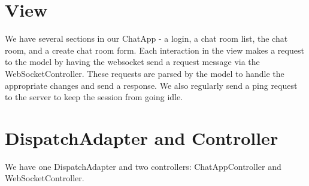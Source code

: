 \documentclass[letterpaper, 11pt]{article}
\begin{document}
\section{View}
We have several sections in our ChatApp - a login, a chat room list, the chat room, and a create chat room form. Each interaction in the view makes a request to the model by having the websocket send a request message via the WebSocketController. These requests are parsed by the model to handle the appropriate changes and send a response. We also regularly send a ping request to the server to keep the session from going idle.

\section{DispatchAdapter and Controller}
We have one DispatchAdapter and two controllers: ChatAppController and WebSocketController. 
\end{document}
